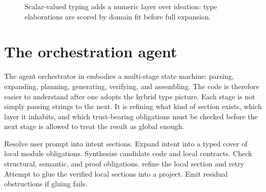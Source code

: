 \begin{figure}[h]
\centering
{}
\caption{Scalar-valued typing adds a numeric layer over ideation: type elaborations are scored by domain fit before full expansion.}
\end{figure}

\section*{The orchestration agent}
The agent orchestrator in  embodies a multi-stage state
machine: parsing, expanding, planning, generating, verifying, and assembling. The code is
therefore easier to understand after one adopts the hybrid type picture. Each stage is not
simply passing strings to the next. It is refining what kind of section exists, which
layer it inhabits, and which trust-bearing obligations must be checked before the next
stage is allowed to treat the result as global enough.

\begin{algorithm}[h]
\caption{Cohomological generation loop}
\begin{algorithmic}[1]
\State Resolve user prompt into intent sections.
\State Expand intent into a typed cover of local module obligations.
  \State Synthesize candidate code and local contracts.
  \State Check structural, semantic, and proof obligations.
    \State refine the local section and retry
  \EndIf
\EndFor
\State Attempt to glue the verified local sections into a project.
\State Emit residual obstructions if gluing fails.
\end{algorithmic}
\end{algorithm}

